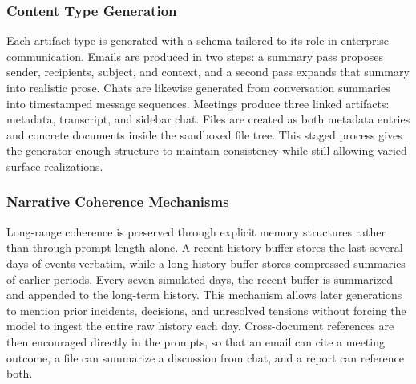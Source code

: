 \subsubsection{Content Type Generation}

Each artifact type is generated with a schema tailored to its role in enterprise communication. Emails are produced in two steps: a summary pass proposes sender, recipients, subject, and context, and a second pass expands that summary into realistic prose. Chats are likewise generated from conversation summaries into timestamped message sequences. Meetings produce three linked artifacts: metadata, transcript, and sidebar chat. Files are created as both metadata entries and concrete documents inside the sandboxed file tree. This staged process gives the generator enough structure to maintain consistency while still allowing varied surface realizations.

\subsubsection{Narrative Coherence Mechanisms}

Long-range coherence is preserved through explicit memory structures rather than through prompt length alone. A recent-history buffer stores the last several days of events verbatim, while a long-history buffer stores compressed summaries of earlier periods. Every seven simulated days, the recent buffer is summarized and appended to the long-term history. This mechanism allows later generations to mention prior incidents, decisions, and unresolved tensions without forcing the model to ingest the entire raw history each day. Cross-document references are then encouraged directly in the prompts, so that an email can cite a meeting outcome, a file can summarize a discussion from chat, and a report can reference both.

